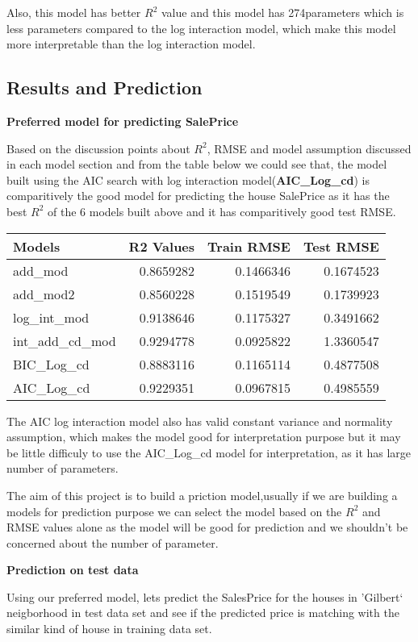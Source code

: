 \documentclass[]{article}
\begin{document}
Also, this model has better \(R^2\) value and this model has
274parameters which is less parameters compared to the log interaction
model, which make this model more interpretable than the log interaction
model.

\subsection{Results and Prediction}\label{results-and-prediction}

\textbf{Preferred model for predicting SalePrice}

Based on the discussion points about \(R^2\), RMSE and model assumption
discussed in each model section and from the table below we could see
that, the model built using the AIC search with log interaction
model(\textbf{AIC\_Log\_cd}) is comparitively the good model for
predicting the house SalePrice as it has the best \(R^2\) of the 6
models built above and it has comparitively good test RMSE.

\begin{longtable}[]{@{}lrrr@{}}
\toprule
Models & R2 Values & Train RMSE & Test RMSE\tabularnewline
\midrule
\endhead
add\_mod & 0.8659282 & 0.1466346 & 0.1674523\tabularnewline
add\_mod2 & 0.8560228 & 0.1519549 & 0.1739923\tabularnewline
log\_int\_mod & 0.9138646 & 0.1175327 & 0.3491662\tabularnewline
int\_add\_cd\_mod & 0.9294778 & 0.0925822 & 1.3360547\tabularnewline
BIC\_Log\_cd & 0.8883116 & 0.1165114 & 0.4877508\tabularnewline
AIC\_Log\_cd & 0.9229351 & 0.0967815 & 0.4985559\tabularnewline
\bottomrule
\end{longtable}

The AIC log interaction model also has valid constant variance and
normality assumption, which makes the model good for interpretation
purpose but it may be little difficuly to use the AIC\_Log\_cd model for
interpretation, as it has large number of parameters.

The aim of this project is to build a priction model,usually if we are
building a models for prediction purpose we can select the model based
on the \(R^2\) and RMSE values alone as the model will be good for
prediction and we shouldn't be concerned about the number of parameter.

\textbf{Prediction on test data}

Using our preferred model, lets predict the SalesPrice for the houses in
'Gilbert` neigborhood in test data set and see if the predicted price is
matching with the similar kind of house in training data set.
\end{document}
